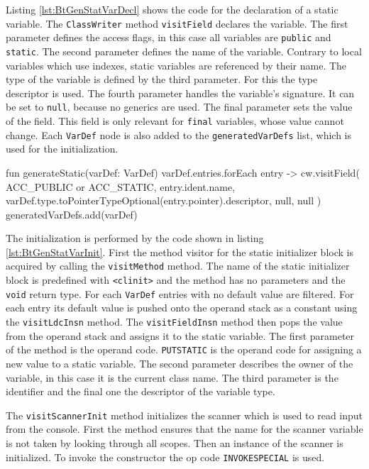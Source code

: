 Listing \ref{lst:BtGenStatVarDecl} shows the code for the declaration of a static variable. The \verb|ClassWriter| method \verb|visitField| declares the variable. The first parameter defines the access flags, in this case all variables are \verb|public| and \verb|static|. The second parameter defines the name of the variable. Contrary to local variables which use indexes, static variables are referenced by their name. The type of the variable is defined by the third parameter. For this the type descriptor is used. The fourth parameter handles the variable's signature. It can be set to \verb|null|, because no generics are used. The final parameter sets the value of the field. This field is only relevant for \verb|final| variables, whose value cannot change. Each \verb|VarDef| node is also added to the \verb|generatedVarDefs| list, which is used for the initialization.



\begin{KotlinCode}[float,numbers=none,caption=Code for the declaration of static variables., label=lst:BtGenStatVarDecl]
fun generateStatic(varDef: VarDef) {
    varDef.entries.forEach { entry ->
        cw.visitField(
            ACC_PUBLIC
                    or ACC_STATIC,
            entry.ident.name,
            varDef.type.toPointerTypeOptional(entry.pointer).descriptor,
            null,
            null
        )
    }
    generatedVarDefs.add(varDef)
}
\end{KotlinCode}

The initialization is performed by the code shown in listing \ref{lst:BtGenStatVarInit}. First the method visitor for the static initializer block is acquired by calling the \verb|visitMethod| method. The name of the static initializer block is predefined with \verb|<clinit>| and the method has no parameters and the \verb|void| return type. For each \verb|VarDef| entries with no default value are filtered. For each entry its default value is pushed onto the operand stack as a constant using the \verb|visitLdcInsn| method. The \verb|visitFieldInsn| method then pops the value from the operand stack and assigns it to the static variable. The first parameter of the method is the operand code. \verb|PUTSTATIC| is the operand code for assigning a new value to a static variable. The second parameter describes the owner of the variable, in this case it is the current class name. The third parameter is the identifier and the final one the descriptor of the variable type.

The \verb|visitScannerInit| method initializes the scanner which is used to read input from the console. First the method ensures that the name for the scanner variable is not taken by looking through all scopes. Then an instance of the scanner is initialized. To invoke the constructor the op code \verb|INVOKESPECIAL| is used.

